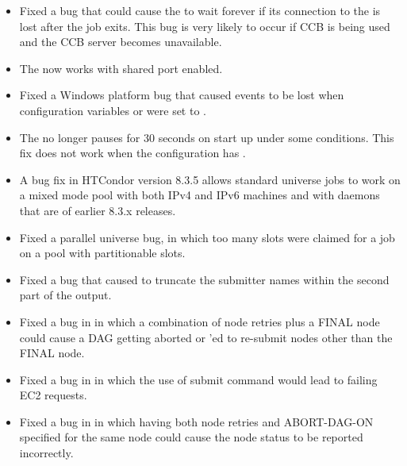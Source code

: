 \begin{itemize}

\item Fixed a bug that could cause the  to wait forever
if its connection to the  is lost after the job exits.
This bug is very likely to occur if CCB is being used and the CCB server
becomes unavailable.

\item The  now works with shared port enabled.

\item Fixed a Windows platform bug that caused events to be lost when 
configuration variables
 or  
were set to .

\item The  no longer pauses for 30 seconds on start up
under some conditions.
This fix does not work when the configuration has 
.

\item A bug fix in HTCondor version 8.3.5 allows standard universe jobs
to work on a mixed mode pool with both IPv4 and IPv6 machines
and with daemons that are of earlier 8.3.x releases.

\item Fixed a parallel universe bug,
in which too many slots were claimed for a job
on a pool with partitionable slots.

\item Fixed a bug that caused  
 to truncate the submitter names within the second part of
the output.

\item Fixed a bug in  in which a combination of node
retries plus a FINAL node could cause a DAG getting aborted or
'ed to re-submit nodes other than the FINAL node.

\item Fixed a bug in  in which the use of submit command
 would lead to failing EC2 requests.

\item Fixed a bug in  in which having both node retries
and ABORT-DAG-ON specified for the same node could cause the node
status to be reported incorrectly.


\end{itemize}
